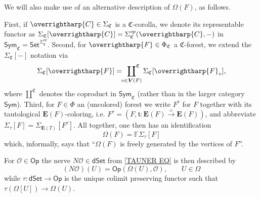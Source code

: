 \documentclass[a4paper,10pt]{article}%
\numberwithin{equation}{section}
\numberwithin{figure}{section}
\theoremstyle{definition} %
\newcommand{\vect}[1]{\text{\overrightharp{\ensuremath{#1}}}}
\newcommand{\Sym}{\ensuremath{\mathsf{Sym}}}%
\renewcommand{\O}{\ensuremath{\mathcal O}}
\newcommand{\1}{\ensuremath{\mathbbm 1}}%
\begin{document}
We will also make use of an alternative description of $\Omega(F)$, as follows.

First, if $\vect{C}\in \Sigma_{\mathfrak{C}}$ is a
$\mathfrak{C}$-corolla,
we denote its representable functor as 
$\Sigma_{\mathfrak C}[\vect C] =
\Sigma_{\mathfrak C}^{op}(\vect C, -)$ in 
$\Sym_{\mathfrak C} = \mathsf{Set}^{\Sigma^{op}_{\mathfrak{C}}}$.
Second, for
$\vect{F}\in \Phi_{\mathfrak{C}}$ a
$\mathfrak{C}$-forest, 
we extend the 
$\Sigma_{\mathfrak C}[-]$ notation via
\[
	\Sigma_{\mathfrak C}[\vect F] = \sideset{}{^{\mathfrak C}}\coprod_{v \in \boldsymbol{V}(F)} \Sigma_{\mathfrak C}[\vect F_v],
\]
where $\amalg^{\mathfrak C}$ denotes the coproduct
in $\Sym_{\mathfrak C}$ (rather than in the larger category $\Sym$).
Third, for 
$F \in \Phi$
an (uncolored) forest we write
$F^{\tau}$ for $F$ together with its tautological 
$\boldsymbol{E}(F)$-coloring, i.e.
$F^{\tau} = 
(F,\mathfrak{t}\colon \boldsymbol{E}(F) \xrightarrow{=} \boldsymbol{E}(F))$,
and abbreviate
$\Sigma_{\tau}[F] = \Sigma_{\boldsymbol{E}(T)}[F^{\tau}]$.
All together, one then has an identification
\begin{equation}\label{OMFFREE EQ}
	\Omega(F) = \mathbb{F} \Sigma_{\tau}[F]
\end{equation}
which, informally, says that 
``$\Omega(F)$ is freely generated by the vertices of $F$''.

For $\O \in \mathsf{Op}$
the nerve $N \O \in \mathsf{dSet}$ from \eqref{TAUNER EQ}
is then described by
\[
	(N \O) (U) = \mathsf{Op}(\Omega(U),\O),\qquad U \in \Omega
\]
while $\tau\colon \mathsf{dSet} \to \mathsf{Op}$
is the unique colimit preserving functor such that
$\tau(\Omega[U]) \to \Omega(U)$.
\end{document}
